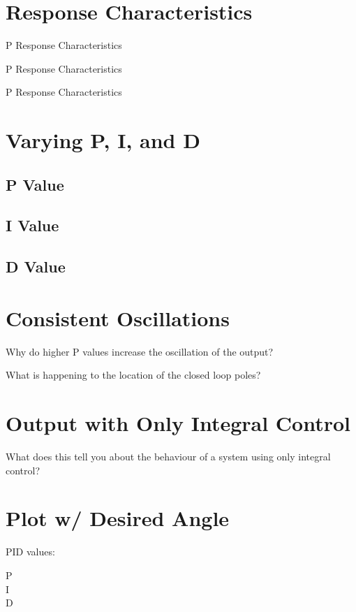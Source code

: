\section{Response Characteristics}

\begin{table}[H]
	\centering
	\caption{P Response Characteristics}
	\label{tab:p-data}
\end{table} 

\begin{table}[H]
	\centering
	\caption{P Response Characteristics}
	\label{tab:p-data}
\end{table} 

\begin{table}[H]
	\centering
	\caption{P Response Characteristics}
	\label{tab:p-data}
\end{table}
\section{Varying P, I, and D}

\subsection{P Value}
\subsection{I Value}
\subsection{D Value}

\section{Consistent Oscillations}

Why do higher P values increase the oscillation of the output?

What is happening to the location of the closed loop poles?

\section{Output with Only Integral Control}

What does this tell you about the behaviour of a system using only integral control?

\section{Plot w/ Desired Angle}
PID values: 
\begin{description}
	\item[P] 
	\item[I]	
	\item[D]
\end{description}
